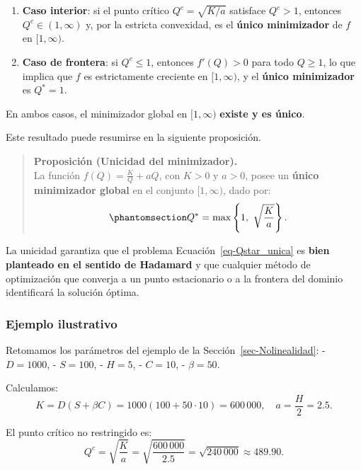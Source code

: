 \documentclass[
  spanish,
  us-letterpaper,
]{scrreprt}
\numberwithin{equation}{section}
\begin{document}
\begin{enumerate}
\def\labelenumi{\arabic{enumi}.}
\item
  \textbf{Caso interior}: si el punto crítico \(Q^c = \sqrt{K/a}\)
  satisface \(Q^c > 1\), entonces \(Q^c \in (1, \infty)\) y, por la
  estricta convexidad, es el \textbf{único minimizador} de \(f\) en
  \([1, \infty)\).
\item
  \textbf{Caso de frontera}: si \(Q^c \leq 1\), entonces \(f'(Q) > 0\)
  para todo \(Q \geq 1\), lo que implica que \(f\) es estrictamente
  creciente en \([1, \infty)\), y el \textbf{único minimizador} es
  \(Q^* = 1\).
\end{enumerate}

En ambos casos, el minimizador global en \([1, \infty)\) \textbf{existe
y es único}.

Este resultado puede resumirse en la siguiente proposición.

\begin{quote}
\textbf{Proposición (Unicidad del minimizador).}\\
La función \(f(Q) = \frac{K}{Q} + a Q\), con \(K > 0\) y \(a > 0\),
posee un \textbf{único minimizador global} en el conjunto
\([1, \infty)\), dado por:
\begin{equation}\phantomsection\label{eq-Qstar_unica}{
Q^* = \max\left\{ 1,\ \sqrt{\frac{K}{a}} \right\}.
}\end{equation}
\end{quote}

La unicidad garantiza que el problema Ecuación~\ref{eq-Qstar_unica} es
\textbf{bien planteado en el sentido de Hadamard} y que cualquier método
de optimización que converja a un punto estacionario o a la frontera del
dominio identificará la solución óptima.

\subsubsection{Ejemplo ilustrativo}\label{ejemplo-ilustrativo-2}

Retomamos los parámetros del ejemplo de la
Sección~\ref{sec-Nolinealidad}: - \(D = 1000\), - \(S = 100\), -
\(H = 5\), - \(C = 10\), - \(\beta = 50\).

Calculamos: \[
K = D(S + \beta C) = 1000(100 + 50 \cdot 10) = 600\,000,
\quad
a = \frac{H}{2} = 2.5.
\]

El punto crítico no restringido es: \[
Q^c = \sqrt{\frac{K}{a}} = \sqrt{\frac{600\,000}{2.5}} = \sqrt{240\,000} \approx 489.90.
\]
\end{document}
